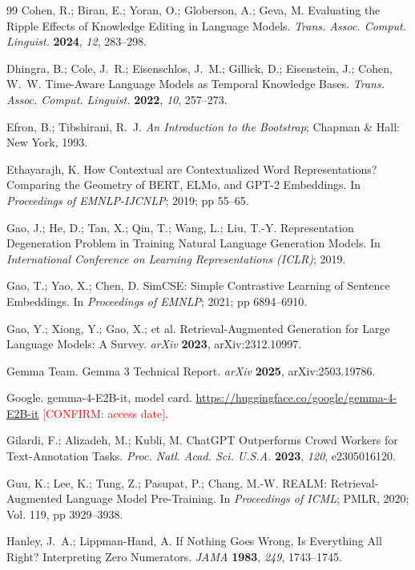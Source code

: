 \documentclass[journal=jcisd8,manuscript=article]{achemso}
\newcommand{\confirm}[1]{\textcolor{red}{[CONFIRM: #1]}} %
\begin{document}
\begin{thebibliography}{99}
 Cohen, R.; Biran, E.; Yoran, O.; Globerson, A.; Geva, M. Evaluating the Ripple Effects of Knowledge Editing in Language Models. \emph{Trans. Assoc. Comput. Linguist.} \textbf{2024}, \emph{12}, 283--298.

 Dhingra, B.; Cole, J.~R.; Eisenschlos, J.~M.; Gillick, D.; Eisenstein, J.; Cohen, W.~W. Time-Aware Language Models as Temporal Knowledge Bases. \emph{Trans. Assoc. Comput. Linguist.} \textbf{2022}, \emph{10}, 257--273.

 Efron, B.; Tibshirani, R.~J. \emph{An Introduction to the Bootstrap}; Chapman \& Hall: New York, 1993.

 Ethayarajh, K. How Contextual are Contextualized Word Representations? Comparing the Geometry of BERT, ELMo, and GPT-2 Embeddings. In \emph{Proceedings of EMNLP-IJCNLP}; 2019; pp 55--65.

 Gao, J.; He, D.; Tan, X.; Qin, T.; Wang, L.; Liu, T.-Y. Representation Degeneration Problem in Training Natural Language Generation Models. In \emph{International Conference on Learning Representations (ICLR)}; 2019.

 Gao, T.; Yao, X.; Chen, D. SimCSE: Simple Contrastive Learning of Sentence Embeddings. In \emph{Proceedings of EMNLP}; 2021; pp 6894--6910.

 Gao, Y.; Xiong, Y.; Gao, X.; et al. Retrieval-Augmented Generation for Large Language Models: A Survey. \emph{arXiv} \textbf{2023}, arXiv:2312.10997.

 Gemma Team. Gemma 3 Technical Report. \emph{arXiv} \textbf{2025}, arXiv:2503.19786.

 Google. gemma-4-E2B-it, model card. \url{https://huggingface.co/google/gemma-4-E2B-it} \confirm{access date}.

 Gilardi, F.; Alizadeh, M.; Kubli, M. ChatGPT Outperforms Crowd Workers for Text-Annotation Tasks. \emph{Proc. Natl. Acad. Sci. U.S.A.} \textbf{2023}, \emph{120}, e2305016120.

 Guu, K.; Lee, K.; Tung, Z.; Pasupat, P.; Chang, M.-W. REALM: Retrieval-Augmented Language Model Pre-Training. In \emph{Proceedings of ICML}; PMLR, 2020; Vol. 119, pp 3929--3938.

 Hanley, J.~A.; Lippman-Hand, A. If Nothing Goes Wrong, Is Everything All Right? Interpreting Zero Numerators. \emph{JAMA} \textbf{1983}, \emph{249}, 1743--1745.


\end{thebibliography}
\end{document}
